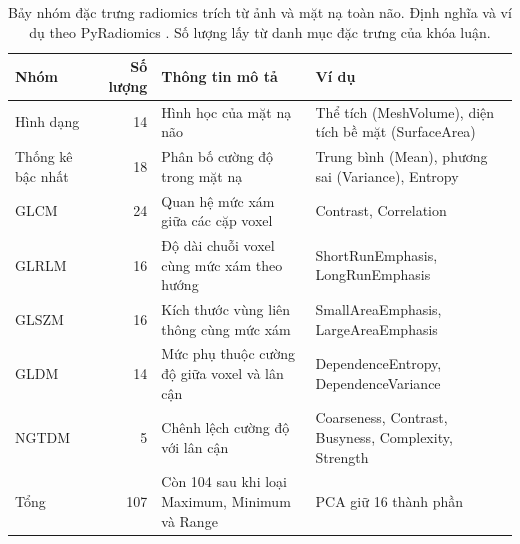 \begin{table}[H]
\centering\small
\caption[Các nhóm đặc trưng radiomics]{Bảy nhóm đặc trưng radiomics trích từ ảnh và mặt nạ toàn não. Định nghĩa và ví dụ theo PyRadiomics \cite{pyradiomicsfeatures}. Số lượng lấy từ danh mục đặc trưng của khóa luận.}
\label{tab:radiomics-groups}
\begin{tabularx}{\linewidth}{@{}L{2.7cm}r Y Y@{}}
\toprule
Nhóm & Số lượng & Thông tin mô tả & Ví dụ \\
\midrule
Hình dạng & 14 & Hình học của mặt nạ não & Thể tích (MeshVolume), diện tích bề mặt (SurfaceArea) \\
Thống kê bậc nhất & 18 & Phân bố cường độ trong mặt nạ & Trung bình (Mean), phương sai (Variance), Entropy \\
GLCM & 24 & Quan hệ mức xám giữa các cặp voxel & Contrast, Correlation \\
GLRLM & 16 & Độ dài chuỗi voxel cùng mức xám theo hướng & ShortRunEmphasis, LongRunEmphasis \\
GLSZM & 16 & Kích thước vùng liên thông cùng mức xám & SmallAreaEmphasis, LargeAreaEmphasis \\
GLDM & 14 & Mức phụ thuộc cường độ giữa voxel và lân cận & DependenceEntropy, DependenceVariance \\
NGTDM & 5 & Chênh lệch cường độ với lân cận & Coarseness, Contrast, Busyness, Complexity, Strength \\
\midrule
Tổng & 107 & Còn 104 sau khi loại Maximum, Minimum và Range & PCA giữ 16 thành phần \\
\bottomrule
\end{tabularx}
\end{table}
